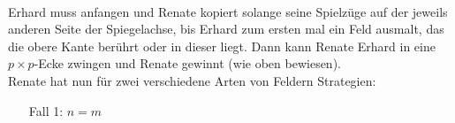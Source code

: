 \documentclass[12pt,a4paper,oneside]{article}
\begin{document}
\\
Erhard muss anfangen und Renate kopiert solange seine Spielzüge auf der jeweils anderen Seite der Spiegelachse, bis Erhard zum ersten mal ein Feld ausmalt, das die obere Kante berührt oder in dieser liegt. Dann kann Renate Erhard in eine $p\times p$-Ecke zwingen und Renate gewinnt (wie oben bewiesen).
\\[10pt]
Renate hat nun für zwei verschiedene Arten von Feldern Strategien:
\begin{itemize}
	\item[Fall 1:] $n=m$
\end{itemize}
\end{document}
